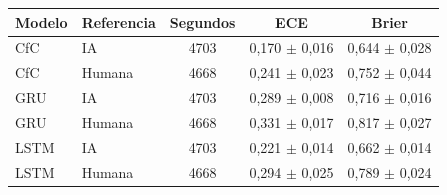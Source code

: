 \begin{tabular}{|l|l|c|c|c|}
\hline
\textbf{Modelo} & \textbf{Referencia} & \textbf{Segundos} & \textbf{ECE} & \textbf{Brier} \\ \hline
CfC & IA & 4703 & 0{,}170 $\pm$ 0{,}016 & 0{,}644 $\pm$ 0{,}028 \\ \hline
CfC & Humana & 4668 & 0{,}241 $\pm$ 0{,}023 & 0{,}752 $\pm$ 0{,}044 \\ \hline
GRU & IA & 4703 & 0{,}289 $\pm$ 0{,}008 & 0{,}716 $\pm$ 0{,}016 \\ \hline
GRU & Humana & 4668 & 0{,}331 $\pm$ 0{,}017 & 0{,}817 $\pm$ 0{,}027 \\ \hline
LSTM & IA & 4703 & 0{,}221 $\pm$ 0{,}014 & 0{,}662 $\pm$ 0{,}014 \\ \hline
LSTM & Humana & 4668 & 0{,}294 $\pm$ 0{,}025 & 0{,}789 $\pm$ 0{,}024 \\ \hline
\end{tabular}
